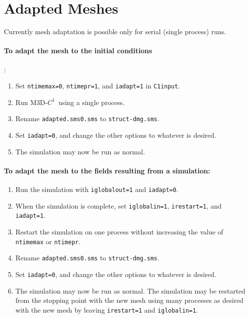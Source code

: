 \documentclass[letterpaper]{book}
\newcommand{\codename}{M3D-$C^1$}
\begin{document}
\section{Adapted Meshes}

Currently mesh adaptation is possible only for serial (single process)
runs.  

\paragraph{To adapt the mesh to the initial conditions}:
\begin{enumerate}
\item Set \texttt{ntimemax=0}, \texttt{ntimepr=1}, and
  \texttt{iadapt=1} in \texttt{C1input}.
\item Run \codename\ using a single process.  
\item Rename \texttt{adapted.sms0.sms} to \texttt{struct-dmg.sms}.
\item Set \texttt{iadapt=0}, and change the other options to whatever
  is desired.  
\item The simulation may now be run as normal.
\end{enumerate}

\paragraph{To adapt the mesh to the fields resulting from a simulation:}
\begin{enumerate}
\item Run the simulation with \texttt{iglobalout=1} and
  \texttt{iadapt=0}.
\item When the simulation is complete, set \texttt{iglobalin=1},
  \texttt{irestart=1}, and \texttt{iadapt=1}.
\item Restart the simulation on one process without increasing the
  value of \texttt{ntimemax} or \texttt{ntimepr}.
\item Rename \texttt{adapted.sms0.sms} to \texttt{struct-dmg.sms}.
\item Set \texttt{iadapt=0}, and change the other
  options to whatever is desired.
\item The simulation may now be run as normal.  The simulation may be
  restarted from the stopping point with the new mesh using many
  processes as desired with the new mesh by leaving
  \texttt{irestart=1} and \texttt{iglobalin=1}.
\end{enumerate}
\end{document}
